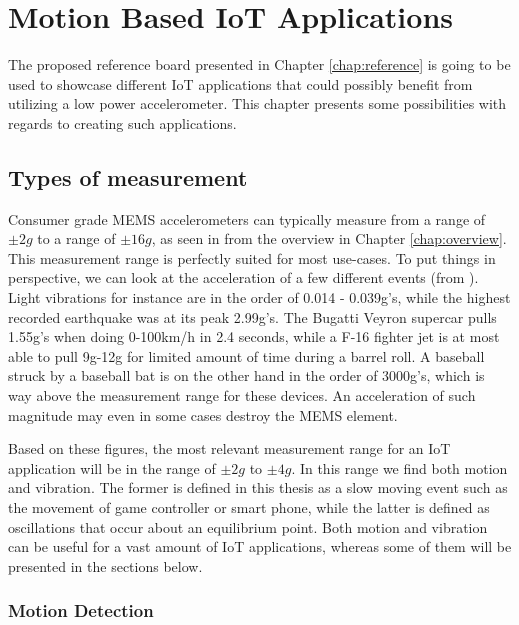 \chapter{Motion Based IoT Applications}
\label{chap:applications}

The proposed reference board presented in Chapter \ref{chap:reference} is going to be used to showcase different IoT applications that could possibly benefit from utilizing a low power accelerometer. This chapter presents some possibilities with regards to creating such applications. 

\section{Types of measurement}

Consumer grade MEMS accelerometers can typically measure from a range of $\pm2g$ to a range of $\pm16g$, as seen in from the overview in Chapter \ref{chap:overview}. This measurement range is perfectly suited for most use-cases. To put things in perspective, we can look at the acceleration of a few different events (from \cite{g-force}). Light vibrations for instance are in the order of 0.014 - 0.039g's, while the highest recorded earthquake was at its peak 2.99g's. The Bugatti Veyron supercar pulls 1.55g's when doing 0-100km/h in 2.4 seconds, while a F-16 fighter jet is at most able to pull 9g-12g for limited amount of time during a barrel roll. A baseball struck by a baseball bat is on the other hand in the order of 3000g's, which is way above the measurement range for these devices. An acceleration of such magnitude may even in some cases destroy the MEMS element. 

Based on these figures, the most relevant measurement range for an IoT application will be in the range of $\pm2g$ to $\pm4g$. In this range we find both motion and vibration. The former is defined in this thesis as a slow moving event such as the movement of game controller or smart phone, while the latter is defined as oscillations that occur about an equilibrium point. Both motion and vibration can be useful for a vast amount of IoT applications, whereas some of them will be presented in the sections below. 

\subsection{Motion Detection}

